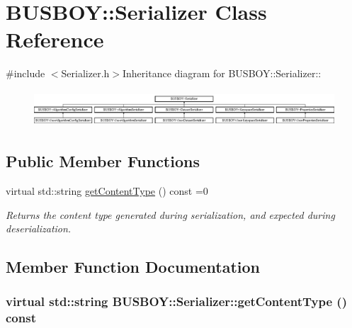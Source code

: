 \hypertarget{classBUSBOY_1_1Serializer}{
\section{BUSBOY::Serializer Class Reference}
\label{classBUSBOY_1_1Serializer}
}


{\ttfamily \#include $<$Serializer.h$>$}Inheritance diagram for BUSBOY::Serializer::\begin{figure}[H]
\begin{center}
\leavevmode
\includegraphics[height=1.35484cm]{classBUSBOY_1_1Serializer}
\end{center}
\end{figure}
\subsection*{Public Member Functions}
\begin{DoxyCompactItemize}
\item 
virtual std::string \hyperlink{classBUSBOY_1_1Serializer_aadfd0df50149a0c59424b5910c5ae3ef}{getContentType} () const =0
\begin{DoxyCompactList}\small\item\em Returns the content type generated during serialization, and expected during deserialization. \item\end{DoxyCompactList}\end{DoxyCompactItemize}


\subsection{Member Function Documentation}
\hypertarget{classBUSBOY_1_1Serializer_aadfd0df50149a0c59424b5910c5ae3ef}{
\subsubsection[{getContentType}]{\setlength{\rightskip}{0pt plus 5cm}virtual std::string BUSBOY::Serializer::getContentType () const}}
\label{classBUSBOY_1_1Serializer_aadfd0df50149a0c59424b5910c5ae3ef}


